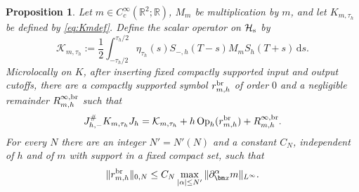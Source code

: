 \documentclass[11pt,reqno]{amsart}
\newtheorem{proposition}{Proposition}[section]
\newcommand{\dd}{\,\mathrm{d}}
\newcommand{\Op}{\operatorname{Op}}
\numberwithin{equation}{section}
\begin{document}
\begin{proposition}
Let $m\in C_c^\infty(\mathbb R^2;\mathbb R)$, $M_m$ be multiplication by $m$, and let $K_{m,\tau_h}$ be defined by \eqref{eq:Kmdef}. Define the scalar operator on $\mathcal H_{\rm s}$ by
\begin{equation*}
\mathcal K_{m,\tau_h}:=\frac12\int_{-\tau_h/2}^{\tau_h/2}\eta_{\tau_h}(s)S_{-,h}(T-s)M_mS_h(T+s)\dd s.
\end{equation*}
Microlocally on $K$, after inserting fixed compactly supported input and output cutoffs, there are a compactly supported symbol $r_{m,h}^{\rm br}$ of order $0$ and a negligible remainder $R_{m,h}^{\infty,\rm br}$ such that
\begin{equation}\label{eq:physical-scalar-bridge}
J_{h,-}^{\#}K_{m,\tau_h}J_h=\mathcal K_{m,\tau_h}+h\Op_h(r_{m,h}^{\rm br})+R_{m,h}^{\infty,\rm br}.
\end{equation}
For every $N$ there are an integer $N'=N'(N)$ and a constant $C_N$, independent of $h$ and of $m$ with support in a fixed compact set, such that
\begin{equation}\label{eq:bridge-symbol-bound}
 \|r_{m,h}^{\rm br}\|_{0,N}\le C_N\max_{|\alpha|\le N'}\|\partial_{\bm x}^\alpha m\|_{L^\infty}.
\end{equation}
\end{proposition}
\end{document}
